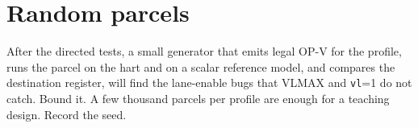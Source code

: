 \section{Random parcels}

After the directed tests, a small generator that emits legal OP-V for the profile, runs the parcel on the hart and on a scalar reference model, and compares the destination register, will find the lane-enable bugs that VLMAX and \texttt{vl}=1 do not catch. Bound it. A few thousand parcels per profile are enough for a teaching design. Record the seed.
